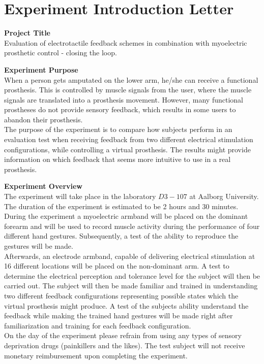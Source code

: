 \section{Experiment Introduction Letter}

\textbf{Project Title} \\
Evaluation of electrotactile feedback schemes in combination with myoelectric prosthetic control - closing the loop. 

\textbf{Experiment Purpose} \\
When a person gets amputated on the lower arm, he/she can receive a functional prosthesis. This is controlled by muscle signals from the user, where the muscle signals are translated into a prosthesis movement. However, many functional prostheses do not provide sensory feedback, which results in some users to abandon their prosthesis. \\
The purpose of the experiment is to compare how subjects perform in an evaluation test when receiving feedback from two different electrical stimulation configurations, while controlling a virtual prosthesis. The results might provide information on which feedback that seems more intuitive to use in a real prosthesis.   

\textbf{Experiment Overview} \\
The experiment will take place in the laboratory $D3-107$ at Aalborg University. The duration of the experiment is estimated to be 2 hours and 30 minutes. During the experiment a myoelectric armband will be placed on the dominant forearm and will be used to record muscle activity during the performance of four different hand gestures. Subsequently, a test of the ability to reproduce the gestures will be made. \\
Afterwards, an electrode armband, capable of delivering electrical stimulation at 16 different locations will be placed on the non-dominant arm. A test to determine the electrical perception and tolerance level for the subject will then be carried out. The subject will then be made familiar and trained in understanding two different feedback configurations representing possible states which the virtual prosthesis might produce. A test of the subjects ability understand the feedback while making the trained hand gestures will be made right after familiarization and training for each feedback configuration. \\
On the day of the experiment please refrain from using any types of sensory deprivation drugs (painkillers and the likes). The test subject will not receive monetary reimbursement upon completing the experiment.  
